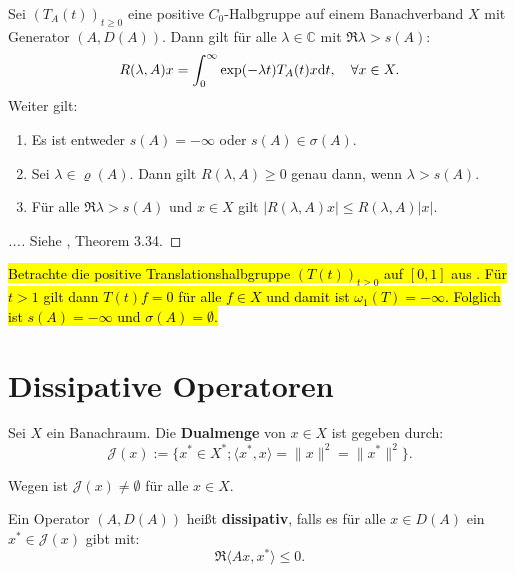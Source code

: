 \begin{satz}
Sei $(T_A(t))_{t\geq0}$ eine positive $C_0$-Halbgruppe auf einem Banachverband $X$ mit Generator $(A, D(A))$. Dann gilt für alle $\lambda\in\mathbb C$ mit $\mathfrak R\lambda > s(A)$:
\begin{equation*}
R(\lambda, A)x=\int_0^\infty \textnormal{exp}(-\lambda t)T_A(t)x\textnormal dt,\quad\forall x\in X.
\end{equation*}
Weiter gilt:
\begin{enumerate}
\item Es ist entweder $s(A)=-\infty$ oder $s(A)\in\sigma(A)$.
\item Sei $\lambda \in \varrho(A)$. Dann gilt $R(\lambda, A)\geq0$ genau dann, wenn $\lambda > s(A)$.
\item Für alle $\mathfrak R\lambda >s(A)$ und $x\in X$ gilt $|R(\lambda, A)x|\leq R(\mathfrak \lambda, A)|x|$.
\end{enumerate}
\end{satz}

\begin{proof}
[...] Siehe \cite{banasiak_arlotti_2006}, Theorem 3.34.
\end{proof}

\begin{bsp}
\hl{Betrachte die positive  \hl{Translationshalbgruppe} $(T(t))_{t\geq0}$ auf $[0,1]$ aus . Für $t>1$ gilt dann $T(t)f=0$ für alle $f\in X$ und damit  ist  \hl{$\omega_1(T)=-\infty$}. Folglich ist $s(A)=-\infty$ und $\sigma(A)=\emptyset$.}
\end{bsp}

\section{Dissipative Operatoren}

\begin{defi}
Sei $X$ ein Banachraum. Die \textbf{Dualmenge} von $x\in X$ ist gegeben durch:
\begin{equation*}
\mathcal J(x):=\{x^*\in X^*; \langle x^*, x\rangle=\|x\|^2 = \|x^*\|^2\}.
\end{equation*}
\end{defi}

\begin{bem}
Wegen \Cref{} ist $\mathcal J(x)\neq \emptyset$ für alle $x\in X$.
\end{bem}


\begin{defi}
Ein Operator $(A, D(A))$ heißt \textbf{dissipativ}, falls es für alle $x\in D(A)$ ein $x^*\in \mathcal J(x)$ gibt mit:
\begin{equation*}
\mathfrak R\langle Ax, x^*\rangle \leq 0.
\end{equation*}
\end{defi}

